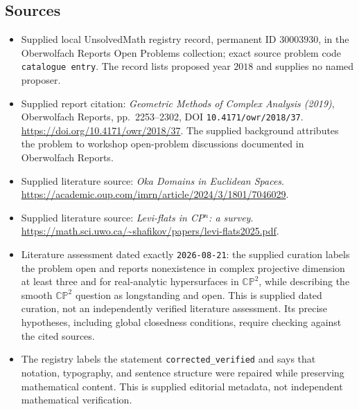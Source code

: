\documentclass[11pt]{article}
\begin{document}
\subsection{Sources}
\begin{itemize}
\item Supplied local UnsolvedMath registry record, permanent ID \(30003930\), in the Oberwolfach Reports Open Problems collection; exact source problem code \texttt{catalogue entry}. The record lists proposed year \(2018\) and supplies no named proposer.
\item Supplied report citation: \emph{Geometric Methods of Complex Analysis (2019)}, Oberwolfach Reports, pp.\ 2253--2302, DOI \texttt{10.4171/owr/2018/37}. \url{https://doi.org/10.4171/owr/2018/37}. The supplied background attributes the problem to workshop open-problem discussions documented in Oberwolfach Reports.
\item Supplied literature source: \emph{Oka Domains in Euclidean Spaces}. \url{https://academic.oup.com/imrn/article/2024/3/1801/7046029}.
\item Supplied literature source: \emph{Levi-flats in CP\(^{n}\): a survey}. \url{https://math.sci.uwo.ca/~shafikov/papers/levi-flats2025.pdf}.
\item Literature assessment dated exactly \texttt{2026-08-21}: the supplied curation labels the problem open and reports nonexistence in complex projective dimension at least three and for real-analytic hypersurfaces in \(\mathbb{CP}^{2}\), while describing the smooth \(\mathbb{CP}^{2}\) question as longstanding and open. This is supplied dated curation, not an independently verified literature assessment. Its precise hypotheses, including global closedness conditions, require checking against the cited sources.
\item The registry labels the statement \texttt{corrected\_verified} and says that notation, typography, and sentence structure were repaired while preserving mathematical content. This is supplied editorial metadata, not independent mathematical verification.
\end{itemize}
\end{document}
